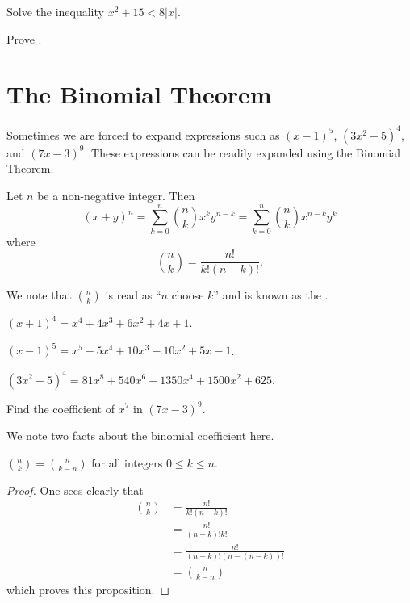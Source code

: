 \begin{exercise}
    Solve the inequality $x^2 + 15 < 8|x|$.
\end{exercise}

\begin{exercise}\label{exercise-triangle-inequality}
    Prove .
\end{exercise}

\section{The Binomial Theorem}
Sometimes we are forced to expand expressions such as $(x-1)^5$, $(3x^2 + 5)^4$, and $(7x - 3)^9$. These expressions can be readily expanded using the Binomial Theorem.
\begin{theorem}\label{thrm-binomial}
    Let $n$ be a non-negative integer. Then
    \[
        (x+y)^n = \sum_{k=0}^n {n \choose k}x^ky^{n-k} = \sum_{k=0}^n {n \choose k}x^{n-k}y^k
    \]
    where
    \[
        {n \choose k} = \frac{n!}{k!(n-k)!}.
    \]
\end{theorem}

We note that ${n \choose k}$ is read as ``$n$ choose $k$'' and is known as the .

\begin{example}
    $(x+1)^4 = x^4 + 4x^3 + 6x^2 + 4x + 1$.
\end{example}

\begin{example}
    $(x-1)^5 = x^5 - 5x^4 + 10x^3 - 10x^2 + 5x - 1$.
\end{example}

\begin{example}
    $(3x^2 + 5)^4 = 81x^8 + 540x^6 + 1350x^4 + 1500x^2 + 625$.
\end{example}

\begin{exercise}
    Find the coefficient of $x^7$ in $(7x-3)^9$.
\end{exercise}

We note two facts about the binomial coefficient here.
\begin{proposition}
    ${n\choose k} = {n\choose {k-n}}$ for all integers $0 \leq k \leq n$.
\end{proposition}
\begin{proof}
    One sees clearly that
    \begin{align*}
        {n\choose k} &= \frac{n!}{k!(n-k)!}\\
        &= \frac{n!}{(n-k)!k!}\\
        &= \frac{n!}{(n-k)!(n-(n-k))!}\\
        &= {n\choose {k-n}}
    \end{align*}
    which proves this proposition.
\end{proof}



